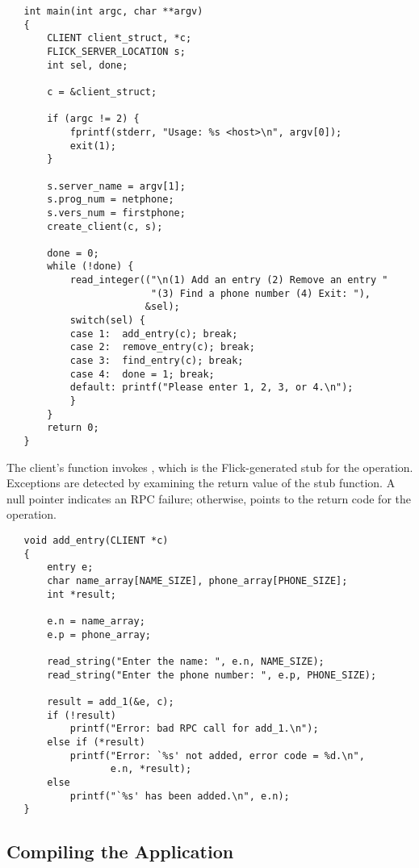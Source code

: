 \begin{verbatim}
   int main(int argc, char **argv)
   {
       CLIENT client_struct, *c;
       FLICK_SERVER_LOCATION s;
       int sel, done;

       c = &client_struct;

       if (argc != 2) {
           fprintf(stderr, "Usage: %s <host>\n", argv[0]);
           exit(1);
       }

       s.server_name = argv[1];
       s.prog_num = netphone;
       s.vers_num = firstphone;
       create_client(c, s);

       done = 0;
       while (!done) {
           read_integer(("\n(1) Add an entry (2) Remove an entry "
                         "(3) Find a phone number (4) Exit: "),
                        &sel);
           switch(sel) {
           case 1:  add_entry(c); break;
           case 2:  remove_entry(c); break;
           case 3:  find_entry(c); break;
           case 4:  done = 1; break;
           default: printf("Please enter 1, 2, 3, or 4.\n");
           }
       }
       return 0;
   }
\end{verbatim}

The client's  function invokes , which is
the Flick-generated stub for the  operation.  Exceptions are detected
by examining the return value of the stub function.  A null pointer indicates
an RPC failure; otherwise,  points to the return code for the
operation.

\begin{verbatim}
   void add_entry(CLIENT *c)
   {
       entry e;
       char name_array[NAME_SIZE], phone_array[PHONE_SIZE];
       int *result;

       e.n = name_array;
       e.p = phone_array;

       read_string("Enter the name: ", e.n, NAME_SIZE);
       read_string("Enter the phone number: ", e.p, PHONE_SIZE);

       result = add_1(&e, c);
       if (!result)
           printf("Error: bad RPC call for add_1.\n");
       else if (*result)
           printf("Error: `%s' not added, error code = %d.\n",
                  e.n, *result);
       else
           printf("`%s' has been added.\n", e.n);
   }
\end{verbatim}



\subsection{Compiling the Application}
\label{subsec:ONCRPC:Compiling the Application}

